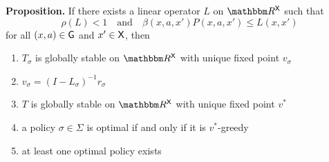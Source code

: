 \documentclass[xcolor=tex,dvipsnames]{beamer}
\begin{document}
\begin{frame}\label{slide:sdd_op}

    \begin{block}{\vspace*{-3ex}}
    {\bf Proposition.} If there exists a linear operator $L$ on $\RR^\Xsf$ such
    that 
    \begin{equation*}
        \rho(L)<1
        \quad \text{and} \quad
        \beta(x, a, x') P(x, a, x') \leq L(x, x')
    \end{equation*}
    for all $(x,a) \in \mathsf G$ and $x' \in \mathsf X$, then 
    \vspace{0.4em}
    \vspace{0.4em}
    \begin{enumerate}
        \item $T_\sigma$ is globally stable on
            $\RR^\Xsf$ with unique fixed point $v_\sigma$
    \vspace{0.4em}
    \vspace{0.4em}
        \item $v_\sigma = (I - L_\sigma)^{-1} r_\sigma$
    \vspace{0.4em}
    \vspace{0.4em}
        \item $T$ is globally stable on
            $\RR^\Xsf$ with unique fixed point $v^*$
    \vspace{0.4em}
    \vspace{0.4em}
        \item a policy $\sigma \in \Sigma$ is optimal if and only if it is
            $v^*$-greedy
    \vspace{0.4em}
    \vspace{0.4em}
        \item at least one optimal policy exists
    \end{enumerate}
    \end{block}

\end{frame}
\end{document}

